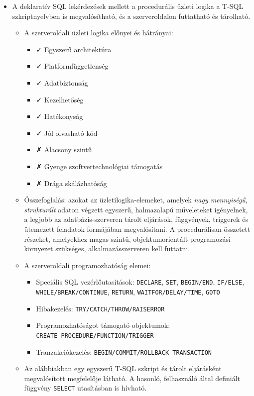 \documentclass[
  magyar,
]{article}
\providecommand{\tightlist}{%
  \setlength{\itemsep}{0pt}\setlength{\parskip}{0pt}}
\begin{document}
\begin{itemize}
\item
  A deklaratív SQL lekérdezések mellett a procedurális üzleti logika a
  T-SQL szkriptnyelvben is megvalósítható, és a szerveroldalon
  futtatható és tárolható.

  \begin{itemize}
  \item
    A szerveroldali üzleti logika előnyei és hátrányai:

    \begin{itemize}
    \tightlist
    \item
      ✓ Egyszerű architektúra
    \item
      ✓ Platformfüggetlenség
    \item
      ✓ Adatbiztonság
    \item
      ✓ Kezelhetőség
    \item
      ✓ Hatékonyság
    \item
      ✓ Jól olvasható kód
    \item
      ✗ Alacsony szintű
    \item
      ✗ Gyenge szoftvertechnológiai támogatás
    \item
      ✗ Drága skálázhatóság
    \end{itemize}
  \item
    Összefoglalás: azokat az üzletilogika-elemeket, amelyek \emph{nagy
    mennyiségű}, \emph{strukturált} adaton végzett egyszerű, halmazalapú
    műveleteket igényelnek, a legjobb az adatbázis-szerveren tárolt
    eljárások, függvények, triggerek és ütemezett feladatok formájában
    megvalósítani. A procedurálisan összetett részeket, amelyekhez magas
    szintű, objektumorientált programozási környezet szükséges,
    alkalmazásszerveren kell futtatni.
  \item
    A szerveroldali programozhatóság elemei:

    \begin{itemize}
    \tightlist
    \item
      Speciális SQL vezérlőutasítások: \texttt{DECLARE}, \texttt{SET},
      \texttt{BEGIN/END}, \texttt{IF/ELSE},
      \texttt{WHILE/BREAK/CONTINUE}, \texttt{RETURN},
      \texttt{WAITFOR/DELAY/TIME}, \texttt{GOTO}
    \item
      Hibakezelés: \texttt{TRY/CATCH/THROW/RAISERROR}
    \item
      Programozhatóságot támogató objektumok:
      \texttt{CREATE\ PROCEDURE/FUNCTION/TRIGGER}
    \item
      Tranzakciókezelés: \texttt{BEGIN/COMMIT/ROLLBACK\ TRANSACTION}
    \end{itemize}
  \item
    Az alábbiakban egy egyszerű T-SQL szkript és tárolt eljárásként
    megvalósított megfelelője látható. A hasonló, felhasználó által
    definiált függvény \texttt{SELECT} utasításban is hívható.
  \end{itemize}
\end{itemize}
\end{document}
